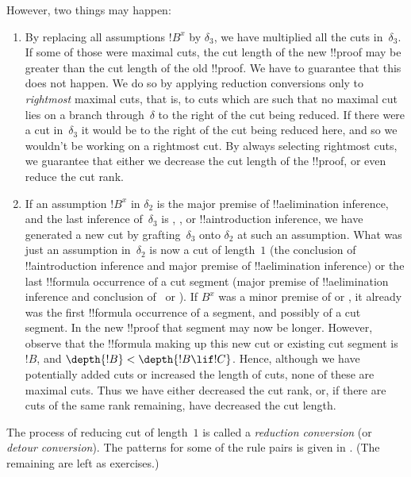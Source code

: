 \documentclass[../../../include/open-logic-section]{subfiles}
\begin{document}
However, two things may happen:
\begin{enumerate}
  \item By replacing all assumptions $!B^x$ by $\delta_3$, we have
  multiplied all the cuts in~$\delta_3$. If some of those were maximal
  cuts, the cut length of the new !!{proof} may be greater than the cut
  length of the old !!{proof}. We have to guarantee that this does not
  happen. We do so by applying reduction conversions only to
  \emph{rightmost} maximal cuts, that is, to cuts which are such that
  no maximal cut lies on a branch through~$\delta$ to the right of the
  cut being reduced. If there were a cut in~$\delta_3$ it would be to
  the right of the cut being reduced here, and so we wouldn't be
  working on a rightmost cut. By always selecting rightmost cuts, we
  guarantee that either we decrease the cut length of the !!{proof},
  or even reduce the cut rank.
  \item If an assumption $!B^x$ in $\delta_2$ is the major premise of
  !!a{elimination} inference, and the last inference of~$\delta_3$ is
  \Elim{\lor}, \Elim{\lexists}, or !!a{introduction} inference, we
  have generated a new cut by grafting~$\delta_3$ onto $\delta_2$ at
  such an assumption. What was just an assumption in~$\delta_2$ is now
  a cut of length~$1$ (the conclusion of !!a{introduction} inference
  and major premise of !!a{elimination} inference) or the last
  !!{formula} occurrence of a cut segment (major premise of
  !!a{elimination} inference and conclusion of~\Elim{\lor} or
  \Elim{\lexists}). If $B^x$ was a minor premise of \Elim{\lor} or
  \Elim{\lexists}, it already was the first !!{formula} occurrence of
  a segment, and possibly of a cut segment. In the new !!{proof} that
  segment may now be longer. However, observe that the !!{formula}
  making up this new cut or existing cut segment is~$!B$, and
  $\depth{!B} < \depth{!B \lif !C}$. Hence, although we have
  potentially added cuts or increased the length of cuts, none of
  these are maximal cuts. Thus we have either decreased the cut rank,
  or, if there are cuts of the same rank remaining, have decreased the
  cut length.
\end{enumerate}

The process of reducing cut of length~$1$ is called a \emph{reduction
conversion} (or \emph{detour conversion}). The
patterns for some of the rule pairs is given in
. (The remaining are left as
exercises.) 
\end{document}
